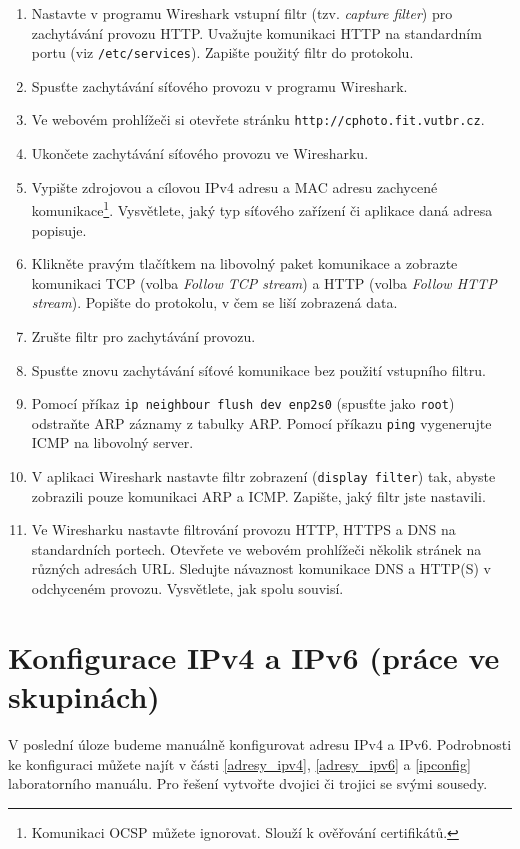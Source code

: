 \documentclass[a4paper,11pt]{article}
\begin{document}
\begin{enumerate}
  \item Nastavte v programu Wireshark vstupní filtr (tzv. {\em capture filter}) pro zachytávání provozu HTTP. Uvažujte komunikaci HTTP na standardním portu (viz {\tt /etc/services}). Zapište použitý filtr do protokolu.
  \item Spusťte zachytávání síťového provozu v programu Wireshark.
  \item Ve webovém prohlížeči si otevřete stránku \texttt{http://cphoto.fit.vutbr.cz}.
  \item Ukončete zachytávání síťového provozu ve Wiresharku. 
  \item Vypište zdrojovou a cílovou IPv4 adresu a MAC adresu zachycené komunikace\footnote{Komunikaci OCSP můžete ignorovat. Slouží k ověřování certifikátů.}. Vysvětlete, jaký typ síťového zařízení či aplikace daná adresa popisuje.
  \item Klikněte pravým tlačítkem na libovolný paket komunikace a zobrazte komunikaci TCP (volba {\em Follow TCP stream}) a HTTP (volba {\em Follow HTTP stream}). Popište do protokolu, v čem se liší zobrazená data. 
  \item Zrušte filtr pro zachytávání provozu.
  \item Spusťte znovu zachytávání síťové komunikace bez použití vstupního filtru.
  \item Pomocí příkaz \texttt{ip neighbour flush dev enp2s0} (spusťte jako {\tt root}) odstraňte ARP záznamy z tabulky ARP. Pomocí příkazu {\tt ping} vygenerujte ICMP na libovolný server.
  \item V aplikaci Wireshark nastavte filtr zobrazení ({\tt display filter}) tak, abyste zobrazili pouze komunikaci ARP a ICMP. Zapište, jaký filtr jste nastavili.
  \item Ve Wiresharku nastavte filtrování provozu HTTP, HTTPS a DNS na standardních portech. Otevřete ve webovém prohlížeči několik stránek na různých adresách URL. Sledujte návaznost komunikace DNS a HTTP(S) v odchyceném provozu. Vysvětlete, jak spolu souvisí. 
\end{enumerate}

\section{Konfigurace IPv4 a IPv6 (práce ve skupinách)}
V poslední úloze budeme manuálně konfigurovat adresu IPv4 a IPv6. Podrobnosti ke konfiguraci můžete najít v části \ref{adresy_ipv4}, \ref{adresy_ipv6} a \ref{ipconfig} laboratorního manuálu. Pro řešení vytvořte dvojici či trojici se svými sousedy.
\end{document}
